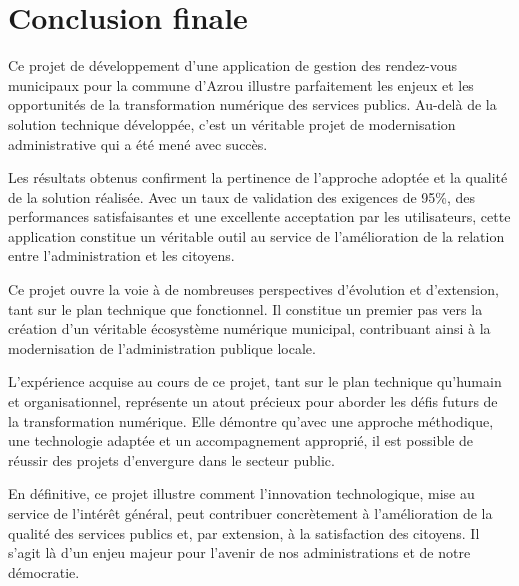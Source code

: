 \section*{Conclusion finale}

Ce projet de développement d'une application de gestion des rendez-vous municipaux pour la commune d'Azrou illustre parfaitement les enjeux et les opportunités de la transformation numérique des services publics. Au-delà de la solution technique développée, c'est un véritable projet de modernisation administrative qui a été mené avec succès.

Les résultats obtenus confirment la pertinence de l'approche adoptée et la qualité de la solution réalisée. Avec un taux de validation des exigences de 95\%, des performances satisfaisantes et une excellente acceptation par les utilisateurs, cette application constitue un véritable outil au service de l'amélioration de la relation entre l'administration et les citoyens.

Ce projet ouvre la voie à de nombreuses perspectives d'évolution et d'extension, tant sur le plan technique que fonctionnel. Il constitue un premier pas vers la création d'un véritable écosystème numérique municipal, contribuant ainsi à la modernisation de l'administration publique locale.

L'expérience acquise au cours de ce projet, tant sur le plan technique qu'humain et organisationnel, représente un atout précieux pour aborder les défis futurs de la transformation numérique. Elle démontre qu'avec une approche méthodique, une technologie adaptée et un accompagnement approprié, il est possible de réussir des projets d'envergure dans le secteur public.

En définitive, ce projet illustre comment l'innovation technologique, mise au service de l'intérêt général, peut contribuer concrètement à l'amélioration de la qualité des services publics et, par extension, à la satisfaction des citoyens. Il s'agit là d'un enjeu majeur pour l'avenir de nos administrations et de notre démocratie.
